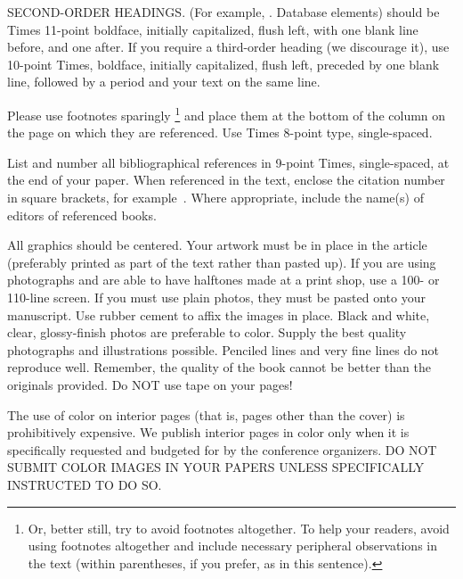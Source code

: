 \documentclass[times, 10pt,twocolumn]{article}
\begin{document}
SECOND-ORDER HEADINGS. (For example, {. Database elements}) 
should be Times 11-point boldface, initially capitalized, flush left, 
with one blank line before, and one after. If you require a third-order 
heading (we discourage it), use 10-point Times, boldface, initially 
capitalized, flush left, preceded by one blank line, followed by a period 
and your text on the same line.


Please use footnotes sparingly%
\footnote
   {%
     Or, better still, try to avoid footnotes altogether.  To help your 
     readers, avoid using footnotes altogether and include necessary 
     peripheral observations in the text (within parentheses, if you 
     prefer, as in this sentence).
   }
and place them at the bottom of the column on the page on which they are 
referenced. Use Times 8-point type, single-spaced.



List and number all bibliographical references in 9-point Times, 
single-spaced, at the end of your paper. When referenced in the text, 
enclose the citation number in square brackets, for example~\cite{ex1}. 
Where appropriate, include the name(s) of editors of referenced books.


All graphics should be centered. Your artwork must be in place in the 
article (preferably printed as part of the text rather than pasted up). 
If you are using photographs and are able to have halftones made at a 
print shop, use a 100- or 110-line screen. If you must use plain photos, 
they must be pasted onto your manuscript. Use rubber cement to affix the 
images in place. Black and white, clear, glossy-finish photos are 
preferable to color. Supply the best quality photographs and 
illustrations possible. Penciled lines and very fine lines do not 
reproduce well. Remember, the quality of the book cannot be better than 
the originals provided. Do NOT use tape on your pages!


The use of color on interior pages (that is, pages other
than the cover) is prohibitively expensive. We publish interior pages in 
color only when it is specifically requested and budgeted for by the 
conference organizers. DO NOT SUBMIT COLOR IMAGES IN YOUR 
PAPERS UNLESS SPECIFICALLY INSTRUCTED TO DO SO.
\end{document}
